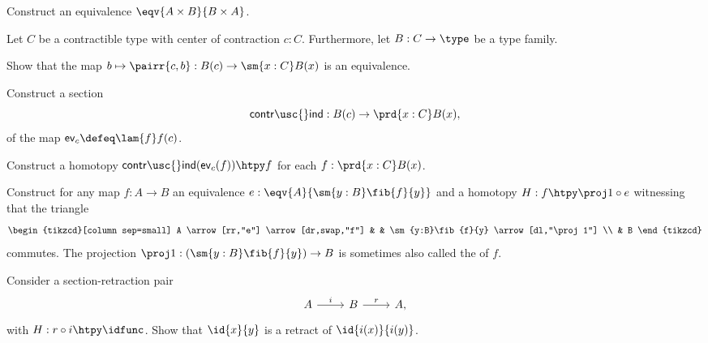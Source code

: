 \begin{exercises}
\item Construct an equivalence $\eqv{A\times B}{B\times A}$.
\item \label{ex:contr_ind} Let $C$ be a contractible type with center of contraction $c:C$. Furthermore, let $B:C\to\type$ be a type family. 
\begin{subexenum}
\item Show that the map $b\mapsto\pairr{c,b}:B(c)\to\sm{x:C}B(x)$ is an equivalence.
\item Construct a section
\begin{equation*}
\mathsf{contr\usc{}ind}:B(c)\to \prd{x:C}B(x),
\end{equation*}
of the map $\mathsf{ev}_c\defeq\lam{f}f(c)$.
\item Construct a homotopy $\mathsf{contr\usc{}ind}(\mathsf{ev}_c(f))\htpy f$ for each $f:\prd{x:C}B(x)$.
\end{subexenum}
\item Construct for any map $f:A\to B$ an equivalence $e:\eqv{A}{\sm{y:B}\fib{f}{y}}$ and a homotopy $H:f\htpy \proj 1\circ e$ witnessing that the triangle
\begin{equation*}
\begin{tikzcd}[column sep=small]
A \arrow[rr,"e"] \arrow[dr,swap,"f"] & & \sm{y:B}\fib{f}{y} \arrow[dl,"\proj 1"] \\
& B
\end{tikzcd}
\end{equation*}
commutes. The projection $\proj 1 : (\sm{y:B}\fib{f}{y})\to B$ is sometimes also called the  of $f$.
\item \label{ex:retr_id} Consider a section-retraction pair
\begin{equation*}
\begin{tikzcd}
A \arrow[r,"i"] & B \arrow[r,"r"] & A,
\end{tikzcd}
\end{equation*}
with $H:r\circ i\htpy \idfunc$. Show that $\id{x}{y}$ is a retract of $\id{i(x)}{i(y)}$.
\end{exercises}
